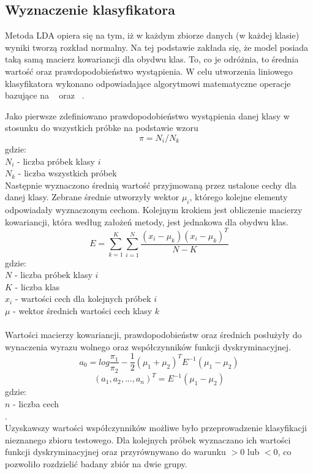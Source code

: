 \documentclass[[10pt,a4paper]{article}
\begin{document}
  \subsection{Wyznaczenie klasyfikatora}
  
Metoda LDA opiera się na tym, iż w każdym zbiorze danych (w każdej klasie) wyniki tworzą rozkład normalny. Na tej podstawie zakłada się, że model posiada taką samą macierz kowariancji dla obydwu klas. To, co je odróżnia, to średnia wartość oraz prawdopodobieństwo wystąpienia. W celu utworzenia liniowego klasyfikatora wykonano odpowiadające algorytmowi matematyczne operacje bazujące na ~\cite{1LDA} oraz ~\cite{2LDA}.

Jako pierwsze zdefiniowano prawdopodobieństwo wystąpienia danej klasy w stosunku do wszystkich próbke na podstawie wzoru
\begin{equation}
 \pi=N_i/N_k
\end{equation}
gdzie:\\
$N_i$ - liczba próbek klasy $i$ \\
$N_k$ - liczba wszystkich próbek\\

Następnie wyznaczono średnią wartość przyjmowaną przez ustalone cechy dla danej klasy. Zebrane średnie utworzyły wektor $\mu_i$, którego kolejne elementy odpowiadały wyznaczonym cechom. Kolejnym krokiem jest obliczenie macierzy kowariancji, która według założeń metody, jest jednakowa dla obydwu klas.
\begin{equation}
E=\sum^K_{k=1}\sum^N_{i=1} \frac{(x_i-\mu_k)(x_i-\mu_k)^T} {N-K}
\end{equation}
gdzie:\\
$N$ - liczba próbek klasy $i$ \\
$K$ - liczba klas\\
$x_i$ - wartości cech dla kolejnych próbek $i$\\
$\mu$ - wektor średnich wartości cech klasy $k$\\
\\
Wartości macierzy kowariancji, prawdopodobieństw oraz średnich posłużyły do wynaczenia wyrazu wolnego oraz współczynników funkcji dyskryminacyjnej.
\begin{equation}
a_0=log\frac{\pi_1}{\pi_2} - \frac{1}{2} (\mu_1+\mu_2)^T E^{-1}(\mu_1-\mu_2)
\end{equation}
\begin{equation}
(a_1,a_2,...,a_n)^T=E^{-1}(\mu_1-\mu_2)
\end{equation}
 gdzie:\\
$n$ - liczba cech \\.
\\
Uzyskawszy wartości współczynników możliwe było przeprowadzenie klasyfikacji nieznanego zbioru testowego. Dla kolejnych próbek wyznaczano ich wartości funkcji dyskryminacyjnej oraz przyrównywano do warunku $>0$ lub $<0$, co pozwoliło rozdzielić badany zbiór na dwie grupy.
 
\end{document}
